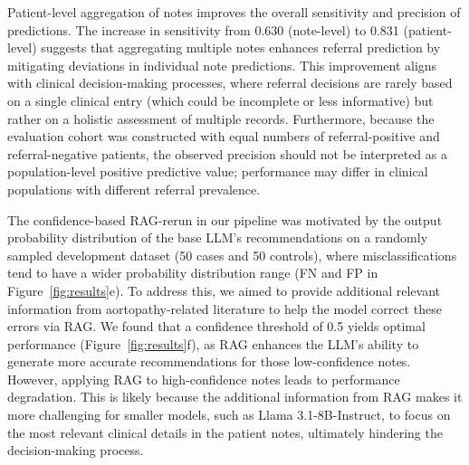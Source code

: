 \documentclass[fleqn,10pt]{wlscirep}
\begin{document}
Patient-level aggregation of notes improves the overall sensitivity and precision of predictions. The increase in sensitivity from 0.630 (note-level) to 0.831 (patient-level) suggests that aggregating multiple notes enhances referral prediction by mitigating deviations in individual note predictions. This improvement aligns with clinical decision-making processes, where referral decisions are rarely based on a single clinical entry (which could be incomplete or less informative) but rather on a holistic assessment of multiple records. Furthermore, because the evaluation cohort was constructed with equal numbers of referral-positive and referral-negative patients, the observed precision should not be interpreted as a population-level positive predictive value; performance may differ in clinical populations with different referral prevalence.

The confidence-based RAG-rerun in our pipeline was motivated by the output probability distribution of the base LLM’s recommendations on a randomly sampled development dataset (50 cases and 50 controls), where misclassifications tend to have a wider probability distribution range (FN and FP in Figure~\ref{fig:results}e). To address this, we aimed to provide additional relevant information from aortopathy-related literature to help the model correct these errors via RAG. We found that a confidence threshold of 0.5 yields optimal performance (Figure~\ref{fig:results}f), as RAG enhances the LLM’s ability to generate more accurate recommendations for those low-confidence notes. However, applying RAG to high-confidence notes leads to performance degradation. This is likely because the additional information from RAG makes it more challenging for smaller models, such as Llama 3.1-8B-Instruct, to focus on the most relevant clinical details in the patient notes, ultimately hindering the decision-making process. 
\end{document}
